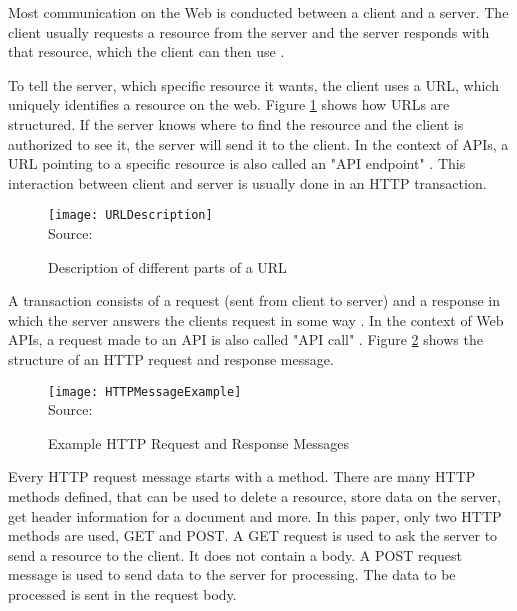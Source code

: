 Most communication on the Web is conducted between a client and a server. The client usually
requests a resource from the server and the server responds with that resource, which the client
can then use \cite[4]{gourley2002http}.


To tell the server, which specific resource it wants, the client uses a \ac{URL}, which 
uniquely identifies a resource on the web. 
Figure \ref{fig:Description of different parts of a URL} shows how URLs are structured.
If the server knows where to find the resource and the client is authorized to see it,
the server will send it to the client.
In the context of APIs, a URL pointing to a specific resource is also called an "API endpoint" \cite{Cooksey2014}.
This interaction between client and server is usually done in an HTTP transaction.

\begin{figure}[H]
    \caption{Description of different parts of a URL}
	\label{fig:Description of different parts of a URL}
    \texttt{[image: URLDescription]}
    \\
    Source: \cite[24]{gourley2002http}
\end{figure}

A transaction consists of a request (sent from client to server) and a response in which the
server answers the clients request in some way \cite[8]{gourley2002http}.
In the context of Web APIs, a request made to an API is also called "API call" \cite{StoplightAPITypes}.
Figure \ref{fig:Example HTTP request and response messages} shows the structure of an 
HTTP request and response message.

\begin{figure}[H]
    \caption{Example HTTP Request and Response Messages}
	\label{fig:Example HTTP request and response messages}
    \texttt{[image: HTTPMessageExample]}
    \\
    Source: \cite[47]{gourley2002http}
\end{figure}

Every HTTP request message starts with a method.
There are many HTTP methods defined, that can be used to delete a resource, store
data on the server, get header information for a document and more.\cite[48]{gourley2002http}
In this paper, only two HTTP methods are used, GET and POST.
A GET request is used to ask the server to send a resource to the client.
It does not contain a body.\cite[48]{gourley2002http}
A POST request message is used to send data to the server for processing. The data to be
processed is sent in the request body.\cite[48]{gourley2002http}

